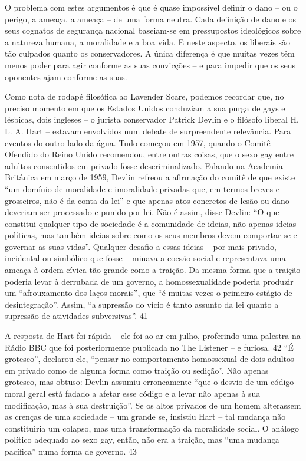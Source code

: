  
\par
 
O problema com estes argumentos é que é quase impossível definir o dano – ou o perigo, a ameaça, a ameaça – de uma forma neutra. Cada definição de dano e os seus cognatos de segurança nacional baseiam-se em pressupostos ideológicos sobre a natureza humana, a moralidade e a boa vida. E neste aspecto, os liberais são tão culpados quanto os conservadores. A única diferença é que muitas vezes têm menos poder para agir conforme as suas convicções – e para impedir que os seus oponentes ajam conforme as suas.
 
\par
 
Como nota de rodapé filosófica ao Lavender Scare, podemos recordar que, no preciso momento em que os Estados Unidos conduziam a sua purga de gays e lésbicas, dois ingleses – o jurista conservador Patrick Devlin e o filósofo liberal H. L. A. Hart – estavam envolvidos num debate de surpreendente relevância. Para eventos do outro lado da água. Tudo começou em 1957, quando o Comitê Ofendido do Reino Unido recomendou, entre outras coisas, que o sexo gay entre adultos consentidos em privado fosse descriminalizado. Falando na Academia Britânica em março de 1959, Devlin refreou a afirmação do comitê de que existe “um domínio de moralidade e imoralidade privadas que, em termos breves e grosseiros, não é da conta da lei” e que apenas atos concretos de lesão ou dano deveriam ser processado e punido por lei. Não é assim, disse Devlin: “O que constitui qualquer tipo de sociedade é a comunidade de ideias, não apenas ideias políticas, mas também ideias sobre como os seus membros devem comportar-se e governar as suas vidas”. Qualquer desafio a essas ideias – por mais privado, incidental ou simbólico que fosse – minava a coesão social e representava uma ameaça à ordem cívica tão grande como a traição. Da mesma forma que a traição poderia levar à derrubada de um governo, a homossexualidade poderia produzir um “afrouxamento dos laços morais”, que “é muitas vezes o primeiro estágio de desintegração”. Assim, “a supressão do vício é tanto assunto da lei quanto a supressão de atividades subversivas”.
 {\color{blue} 41}  

 
\par
 
A resposta de Hart foi rápida – ele foi ao ar em julho, proferindo uma palestra na Rádio BBC que foi posteriormente publicada no The Listener – e furiosa.
 {\color{blue} 42}  
“É grotesco”, declarou ele, “pensar no comportamento homossexual de dois adultos em privado como de alguma forma como traição ou sedição”. Não apenas grotesco, mas obtuso: Devlin assumiu erroneamente “que o desvio de um código moral geral está fadado a afetar esse código e a levar não apenas à sua modificação, mas à sua destruição”. Se os altos privados de um homem alterassem as crenças de uma sociedade – um grande se, insistiu Hart – tal mudança não constituiria um colapso, mas uma transformação da moralidade social. O análogo político adequado ao sexo gay, então, não era a traição, mas “uma mudança pacífica” numa forma de governo.
 {\color{blue} 43}  

